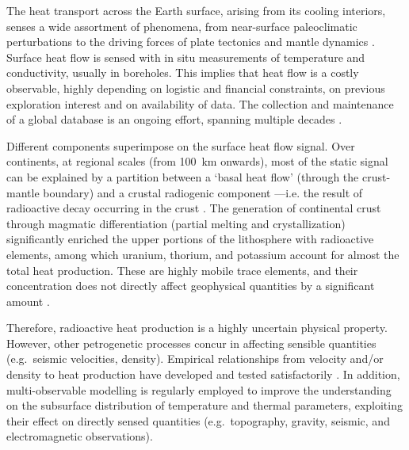 



The heat transport across the Earth surface, arising from its cooling interiors, senses a wide assortment of phenomena, from near-surface paleoclimatic perturbations \parencite{Majorowicz2011} to the driving forces of plate tectonics and mantle dynamics \parencite{Cooper2017}.
Surface heat flow is sensed with in situ measurements of temperature and conductivity, usually in boreholes.
This implies that heat flow is a costly observable, highly depending on logistic and financial constraints, on previous exploration interest and on availability of data.
The collection and maintenance of a global database is an ongoing effort, spanning multiple decades \parencites{Lee1965}{Hasterok2008}.

Different components superimpose on the surface heat flow signal.
Over continents, at regional scales (from \SI{100}{\kilo \metre} onwards), most of the static signal can be explained by a partition between a `basal heat flow' (through the crust-mantle boundary) and a crustal radiogenic component ---i.e. the result of radioactive decay occurring in the crust \parencite{Jaupart2016}.
The generation of continental crust through magmatic differentiation (partial melting and crystallization) significantly enriched the upper portions of the lithosphere with radioactive elements, among which uranium, thorium, and potassium account for almost the total heat production.
These are highly mobile trace elements, and their concentration does not directly affect geophysical quantities by a significant amount \parencite{Hasterok2017_mis}.

Therefore, radioactive heat production is a highly uncertain physical property.
However, other petrogenetic processes concur in affecting sensible quantities (e.g.~seismic velocities, density).
Empirical relationships from velocity and/or density to heat production have developed and tested satisfactorily \parencites{Rudnick2003}{Vila2010}{Hasterok2017_ign}.
In addition, multi-observable modelling \parencites[e.g.][]{Mather2018}{Afonso2019} is regularly employed to improve the understanding on the subsurface distribution of temperature and thermal parameters, exploiting their effect on directly sensed quantities (e.g.~topography, gravity, seismic, and electromagnetic observations).

